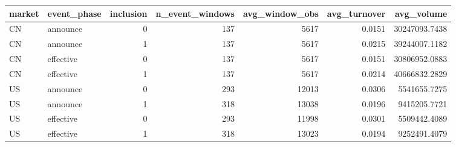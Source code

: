 \begin{tabular}{llrrrrr}
\toprule
market & event_phase & inclusion & n_event_windows & avg_window_obs & avg_turnover & avg_volume \\
\midrule
CN & announce & 0 & 137 & 5617 & 0.0151 & 30247093.7438 \\
CN & announce & 1 & 137 & 5617 & 0.0215 & 39244007.1182 \\
CN & effective & 0 & 137 & 5617 & 0.0151 & 30806952.0883 \\
CN & effective & 1 & 137 & 5617 & 0.0214 & 40666832.2829 \\
US & announce & 0 & 293 & 12013 & 0.0306 & 5541655.7275 \\
US & announce & 1 & 318 & 13038 & 0.0196 & 9415205.7721 \\
US & effective & 0 & 293 & 11998 & 0.0301 & 5509442.4089 \\
US & effective & 1 & 318 & 13023 & 0.0194 & 9252491.4079 \\
\bottomrule
\end{tabular}
